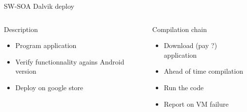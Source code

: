 %
\begin{Frame}{SW-SOA Dalvik deploy}
  \begin{columns}[t]
    \begin{column}{\BW} %
      \begin{block}{Description}
        \begin{itemize}
        \item Program application
        \item Verify functionnality agains Android version
        \item Deploy on google store
        \end{itemize}
      \end{block} 
    \end{column}
    
    \begin{column}{\BW} %
      \begin{block}{Compilation chain}
        \begin{itemize}
        \item Download (pay ?) application
        \item Ahead of time compilation
        \item Run the code
        \item Report on VM failure
        \end{itemize}
      \end{block}   
    \end{column}
  \end{columns}  

\end{Frame}


